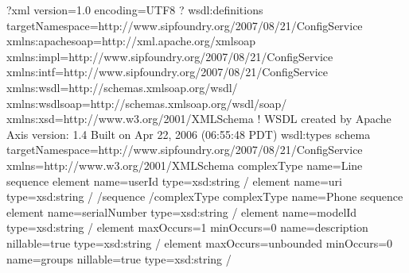 \documentclass[letterpaper,10pt,english]{sphinxmanual}
\begin{document}

\begin{sphinxVerbatim}[commandchars=\\\{\}]
\end{sphinxVerbatim}


\begin{sphinxVerbatim}[commandchars=\\\{\}]
\PYGZlt{}?xml version=\PYGZdq{}1.0\PYGZdq{} encoding=\PYGZdq{}UTF\PYGZhy{}8\PYGZdq{} ?\PYGZgt{}
\PYGZlt{}wsdl:definitions targetNamespace=\PYGZdq{}http://www.sipfoundry.org/2007/08/21/ConfigService\PYGZdq{} xmlns:apachesoap=\PYGZdq{}http://xml.apache.org/xml\PYGZhy{}soap\PYGZdq{} xmlns:impl=\PYGZdq{}http://www.sipfoundry.org/2007/08/21/ConfigService\PYGZdq{} xmlns:intf=\PYGZdq{}http://www.sipfoundry.org/2007/08/21/ConfigService\PYGZdq{} xmlns:wsdl=\PYGZdq{}http://schemas.xmlsoap.org/wsdl/\PYGZdq{} xmlns:wsdlsoap=\PYGZdq{}http://schemas.xmlsoap.org/wsdl/soap/\PYGZdq{} xmlns:xsd=\PYGZdq{}http://www.w3.org/2001/XMLSchema\PYGZdq{}\PYGZgt{}
\PYGZhy{} \PYGZlt{}!\PYGZhy{}\PYGZhy{}
WSDL created by Apache Axis version: 1.4
Built on Apr 22, 2006 (06:55:48 PDT)
\PYGZhy{}\PYGZhy{}\PYGZgt{}
\PYGZlt{}wsdl:types\PYGZgt{}
\PYGZlt{}schema targetNamespace=\PYGZdq{}http://www.sipfoundry.org/2007/08/21/ConfigService\PYGZdq{} xmlns=\PYGZdq{}http://www.w3.org/2001/XMLSchema\PYGZdq{}\PYGZgt{}
\PYGZlt{}complexType name=\PYGZdq{}Line\PYGZdq{}\PYGZgt{}
\PYGZlt{}sequence\PYGZgt{}
\PYGZlt{}element name=\PYGZdq{}userId\PYGZdq{} type=\PYGZdq{}xsd:string\PYGZdq{} /\PYGZgt{}
\PYGZlt{}element name=\PYGZdq{}uri\PYGZdq{} type=\PYGZdq{}xsd:string\PYGZdq{} /\PYGZgt{}
\PYGZlt{}/sequence\PYGZgt{}
\PYGZlt{}/complexType\PYGZgt{}
\PYGZlt{}complexType name=\PYGZdq{}Phone\PYGZdq{}\PYGZgt{}
\PYGZlt{}sequence\PYGZgt{}
\PYGZlt{}element name=\PYGZdq{}serialNumber\PYGZdq{} type=\PYGZdq{}xsd:string\PYGZdq{} /\PYGZgt{}
\PYGZlt{}element name=\PYGZdq{}modelId\PYGZdq{} type=\PYGZdq{}xsd:string\PYGZdq{} /\PYGZgt{}
\PYGZlt{}element maxOccurs=\PYGZdq{}1\PYGZdq{} minOccurs=\PYGZdq{}0\PYGZdq{} name=\PYGZdq{}description\PYGZdq{} nillable=\PYGZdq{}true\PYGZdq{} type=\PYGZdq{}xsd:string\PYGZdq{} /\PYGZgt{}
\PYGZlt{}element maxOccurs=\PYGZdq{}unbounded\PYGZdq{} minOccurs=\PYGZdq{}0\PYGZdq{} name=\PYGZdq{}groups\PYGZdq{} nillable=\PYGZdq{}true\PYGZdq{} type=\PYGZdq{}xsd:string\PYGZdq{} /\PYGZgt{}

\end{sphinxVerbatim}
\end{document}
